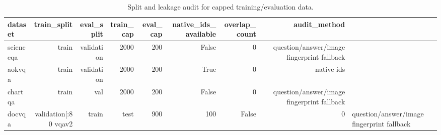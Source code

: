 \begin{table}
\caption{Split and leakage audit for capped training/evaluation data.}
\label{tab:split_leakage_audit}
\begin{tabular}{lrrrrrrr}
\toprule
dataset & train_split & eval_split & train_cap & eval_cap & native_ids_available & overlap_count & audit_method \\
\midrule
scienceqa & train & validation & 2000 & 200 & False & 0 & question/answer/image fingerprint fallback \\
aokvqa & train & validation & 2000 & 200 & True & 0 & native ids \\
chartqa & train & val & 2000 & 200 & False & 0 & question/answer/image fingerprint fallback \\
docvqa & validation[:80%
vqav2 & train & test & 900 & 100 & False & 0 & question/answer/image fingerprint fallback \\
\bottomrule
\end{tabular}
\end{table}
